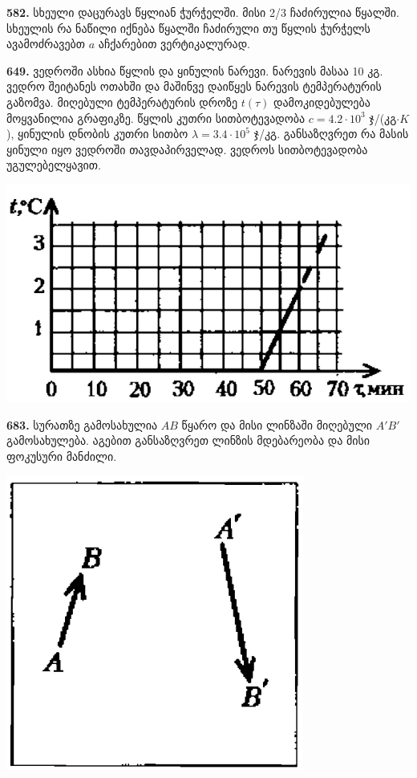 \documentclass[12pt,a4paper,]{report}
\begin{document}
\textbf{582.} სხეული დაცურავს წყლიან ჭურჭელში. მისი 2/3 ჩაძირულია წყალში. სხეულის რა ნაწილი იქნება წყალში ჩაძირული თუ წყლის ჭურჭელს ავამოძრავებთ $a$ აჩქარებით ვერტიკალურად. 

\textbf{649.} ვედროში ასხია წყლის და ყინულის ნარევი. ნარევის მასაა 10 კგ. ვედრო შეიტანეს ოთახში და მაშინვე დაიწყეს ნარევის ტემპერატურის გაზომვა. მიღებული ტემპერატურის დროზე $t(\tau)$ დამოკიდებულება მოყვანილია გრაფიკზე. წყლის კუთრი სითბოტევადობა $c=4.2\cdot10^3$ ჯ/(კგ$\cdot K$), ყინულის დნობის კუთრი სითბო $\lambda=3.4\cdot10^5$ ჯ/კგ. განსაზღვრეთ რა მასის ყინული იყო ვედროში თავდაპირველად. ვედროს სითბოტევადობა უგულებელყავით. 
		\begin{center}
			\includegraphics[scale=0.5]{images/F649.png}
		\end{center}

\textbf{683.} სურათზე გამოსახულია $AB$ წყარო და მისი ლინზაში მიღებული $A'B'$ გამოსახულება. აგებით განსაზღვრეთ ლინზის მდებარეობა და მისი ფოკუსური მანძილი. 
		\begin{center}
			\includegraphics[scale=0.5]{images/F683.png}
		\end{center}
	
\end{document}
